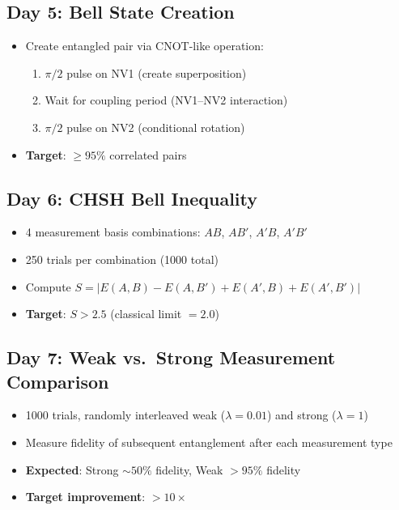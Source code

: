 \documentclass[11pt,a4paper,openany]{book}
\begin{document}
\subsection{Day 5: Bell State Creation}

\begin{itemize}[nosep]
  \item Create entangled pair via CNOT-like operation:
    \begin{enumerate}[nosep]
      \item $\pi/2$ pulse on NV1 (create superposition)
      \item Wait for coupling period (NV1--NV2 interaction)
      \item $\pi/2$ pulse on NV2 (conditional rotation)
    \end{enumerate}
  \item \textbf{Target}: $\geq 95\%$ correlated pairs
\end{itemize}

\subsection{Day 6: CHSH Bell Inequality}

\begin{itemize}[nosep]
  \item 4 measurement basis combinations: $AB$, $AB'$, $A'B$, $A'B'$
  \item 250 trials per combination (1000 total)
  \item Compute $S = |E(A,B) - E(A,B') + E(A',B) + E(A',B')|$
  \item \textbf{Target}: $S > 2.5$ (classical limit $= 2.0$)
\end{itemize}

\subsection{Day 7: Weak vs.\ Strong Measurement Comparison}

\begin{itemize}[nosep]
  \item 1000 trials, randomly interleaved weak ($\lambda = 0.01$) and strong ($\lambda = 1$)
  \item Measure fidelity of subsequent entanglement after each measurement type
  \item \textbf{Expected}: Strong ${\sim}50\%$ fidelity, Weak $> 95\%$ fidelity
  \item \textbf{Target improvement}: $> 10\times$
\end{itemize}
\end{document}
